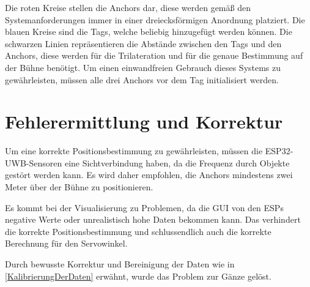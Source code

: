 Die roten Kreise stellen die Anchors dar, diese werden gemäß den Systemanforderungen immer in einer dreiecksförmigen Anordnung platziert. Die blauen Kreise sind die Tags, welche beliebig hinzugefügt werden können. Die schwarzen Linien repräsentieren die Abstände zwischen den Tags und den Anchors, diese werden für die Trilateration und für die genaue Bestimmung auf der Bühne benötigt. Um einen einwandfreien Gebrauch dieses Systems zu gewährleisten, müssen alle drei Anchors vor dem Tag initialisiert werden. 

\newpage
\section{Fehlerermittlung und Korrektur}
Um eine korrekte Positionsbestimmung zu gewährleisten, müssen die ESP32-UWB-Sensoren eine Sichtverbindung haben, da die Frequenz durch Objekte gestört werden kann. Es wird daher empfohlen, die Anchors mindestens zwei Meter über der Bühne zu positionieren.

Es kommt bei der Visualisierung zu Problemen, da die GUI von den ESPs negative Werte oder unrealistisch hohe Daten bekommen kann. Das verhindert die korrekte Positionsbestimmung und schlussendlich auch die korrekte Berechnung für den Servowinkel. 

Durch bewusste Korrektur und Bereinigung der Daten wie in \ref{KalibrierungDerDaten} erwähnt, wurde das Problem zur Gänze gelöst.

